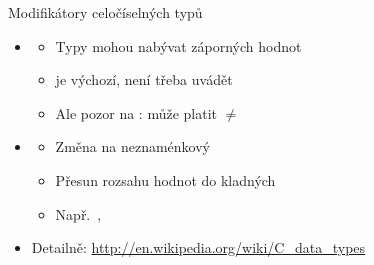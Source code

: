 \begin{frame}{Modifikátory celočíselných typů}

  \begin{itemize}
    \item {}
    \begin{itemize}
      \item Typy mohou nabývat záporných hodnot
      \item {} je výchozí, není třeba uvádět

      \pause

      \item Ale pozor na : může platit  $\neq$
    \end{itemize}

    \pause

    \item {}
    \begin{itemize}
      \item Změna na neznaménkový
      \item Přesun rozsahu hodnot do kladných
      \item Např.\ , 
    \end{itemize}

    \pause

    \item Detailně: \url{http://en.wikipedia.org/wiki/C_data_types}
  \end{itemize}

\end{frame}

